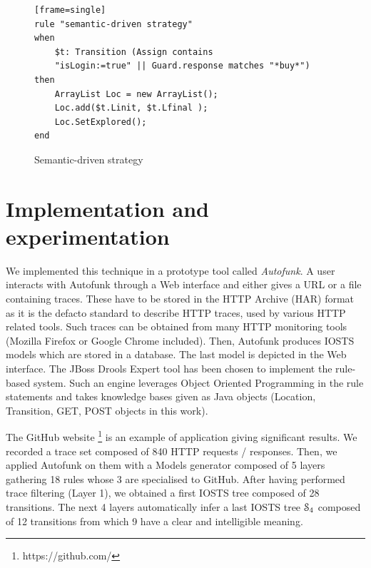 \begin{figure}[ht]
\begin{center}
\begin{scriptsize}
\begin{verbatim}[frame=single]
rule "semantic-driven strategy"
when
    $t: Transition (Assign contains
    "isLogin:=true" || Guard.response matches "*buy*")
then
    ArrayList Loc = new ArrayList();
    Loc.add($t.Linit, $t.Lfinal );
    Loc.SetExplored();
end
\end{verbatim}
\end{scriptsize}
\end{center}

\caption {Semantic-driven strategy} \label{fig:rule:semdriven}
\end{figure}



\section{Implementation and experimentation}
\label{sec:modelinf:webapps:exp}

We implemented this technique in a prototype tool called
\emph{Autofunk}. A user interacts with Autofunk through a Web
interface and either gives a URL  or a file containing traces.
These have to be stored in the HTTP Archive (HAR) format as it is
the defacto standard to describe HTTP traces, used by various
HTTP related tools. Such traces can be obtained from many HTTP
monitoring tools (Mozilla Firefox or Google Chrome included).
Then, Autofunk produces IOSTS models which are stored in a
database. The last model is depicted in the Web interface. The
JBoss Drools Expert tool has been chosen to implement the
rule-based system. Such an engine leverages Object Oriented
Programming in the rule statements and takes knowledge bases
given as Java objects (Location, Transition, GET, POST objects in
this work).

The GitHub website \footnote{https://github.com/} is an example
of application giving significant results. We recorded a trace
set composed of 840 HTTP requests / responses. Then, we applied
Autofunk on them with a Models generator composed of 5 layers
gathering 18 rules whose 3 are specialised to GitHub. After
having performed trace filtering (Layer 1), we obtained a first
IOSTS tree composed of 28 transitions. The next 4 layers
automatically infer a last IOSTS tree $\EuScript{S}_4$ composed
of 12 transitions from which 9 have a clear and intelligible
meaning.

